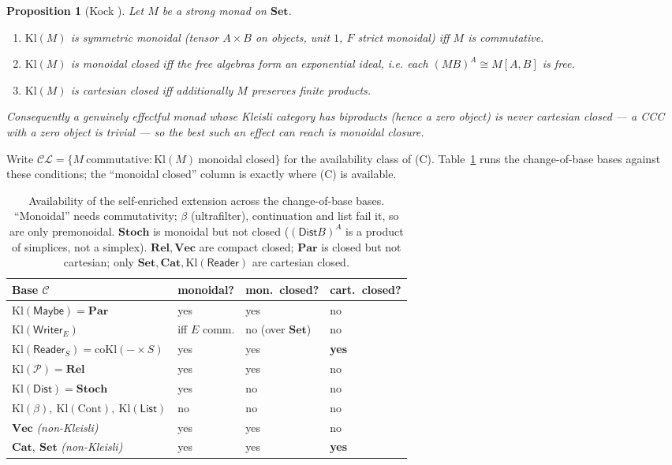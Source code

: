 \documentclass[11pt]{amsart}
\theoremstyle{plain}
\newtheorem{proposition}[theorem]{Proposition}
\theoremstyle{definition}
\theoremstyle{remark}
\newcommand{\Set}{\mathbf{Set}}
\newcommand{\Cat}{\mathbf{Cat}}
\newcommand{\Vect}{\mathbf{Vec}}
\newcommand{\Rel}{\mathbf{Rel}}
\newcommand{\Par}{\mathbf{Par}}
\newcommand{\Stoch}{\mathbf{Stoch}}
\newcommand{\Kl}{\mathrm{Kl}}
\newcommand{\Writer}{\mathsf{Writer}}
\newcommand{\Maybe}{\mathsf{Maybe}}
\newcommand{\Reader}{\mathsf{Reader}}
\newcommand{\Dist}{\mathsf{Dist}}
\newcommand{\List}{\mathsf{List}}
\newcommand{\PP}{\mathcal{P}}
\newcommand{\C}{\mathcal{C}}
\newcommand{\CL}{\mathcal{CL}}
\begin{document}
\begin{proposition}[Kock \cite{KockMonoidal,KockClosed}]\label{prop:kock}
Let $M$ be a strong monad on $\Set$.
\begin{enumerate}[label=\textup{(\arabic*)},leftmargin=2.4em]
  \item $\Kl(M)$ is symmetric monoidal (tensor $A\times B$ on objects, unit $1$, $F$ strict monoidal)
    \emph{iff} $M$ is commutative.
  \item $\Kl(M)$ is monoidal closed \emph{iff} the free algebras form an exponential ideal, i.e. each
    $(MB)^A\cong M[A,B]$ is free.
  \item $\Kl(M)$ is cartesian closed \emph{iff} additionally $M$ preserves finite products.
\end{enumerate}
Consequently a genuinely effectful monad whose Kleisli category has biproducts (hence a zero object)
is never cartesian closed --- a CCC with a zero object is trivial --- so the best such an effect can
reach is monoidal closure.
\end{proposition}

Write $\CL=\{M\ \text{commutative}: \Kl(M)\ \text{monoidal closed}\}$ for the availability class of
(C). Table~\ref{tab:bases} runs the change-of-base bases against these conditions; the ``monoidal
closed'' column is exactly where (C) is available.

\begin{table}[t]
\small
\begin{tabular}{@{}llll@{}}
\toprule
Base $\C$ & monoidal? & mon.\ closed? & cart.\ closed? \\
\midrule
$\Kl(\Maybe)=\Par$ & yes & yes & no \\
$\Kl(\Writer_E)$ & iff $E$ comm. & no (over $\Set$) & no \\
$\Kl(\Reader_S)=\mathrm{coKl}(-\times S)$ & yes & yes & \textbf{yes} \\
$\Kl(\PP)=\Rel$ & yes & yes & no \\
$\Kl(\Dist)=\Stoch$ & yes & no & no \\
$\Kl(\beta),\ \Kl(\mathrm{Cont}),\ \Kl(\List)$ & no & no & no \\
$\Vect$ \textit{(non-Kleisli)} & yes & yes & no \\
$\Cat,\ \Set$ \textit{(non-Kleisli)} & yes & yes & \textbf{yes} \\
\bottomrule
\end{tabular}
\medskip
\caption{Availability of the self-enriched extension across the change-of-base bases. ``Monoidal''
needs commutativity; $\beta$ (ultrafilter), continuation and list fail it, so are only premonoidal.
$\Stoch$ is monoidal but not closed ($(\Dist B)^A$ is a product of simplices, not a simplex).
$\Rel,\Vect$ are compact closed; $\Par$ is closed but not cartesian; only $\Set,\Cat,\Kl(\Reader)$ are
cartesian closed.}
\label{tab:bases}
\end{table}
\end{document}
